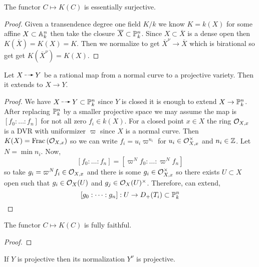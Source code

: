 \documentclass[12pt]{article}
\begin{document}
\begin{prop}
The functor $C \mapsto K(C)$ is essentially surjective. 
\end{prop}

\begin{proof}
Given a transendence degree one field $K / k$ we know $K = k(X)$ for some affine $X \subset \A^n_k$ then take the closure $\overline{X} \subset \P^n_k$. Since $X \subset \overline{X}$ is a dense open then $K(\overline{X}) = K(X) = K$. Then we normalize to get $\overline{X}^\nu \to \overline{X}$ which is birational so get get $K(\overline{X}^\nu) = K(X)$. 
\end{proof}

\begin{lemma}
Let $X \rat Y$ be a rational map from a normal curve to a projective variety. Then it extends to $X \to Y$. 
\end{lemma}

\begin{proof}
We have $X \rat Y \subset \P^n_k$ since $Y$ is closed it is enough to extend $X \to \P^n_k$. After replacing $\P^n_k$ by a smaller projective space we may assume the map is $[f_0 : \dots : f_n]$ for not all zero $f_i \in k(X)$. For a closed point $x \in X$ the ring $\stalk{X}{x}$ is a DVR with uniformizer $\varpi$ since $X$ is a normal curve. Then $K(X) = \Frac{\stalk{X}{x}}$ so we can write $f_i = u_i \varpi^{n_i}$ for $u_i \in \stalk{X}{x}^\times$ and $n_i \in \Z$. Let $N = \min{n_i}$. Now,
\[ [f_0 : \dots : f_n] = [ \varpi^{N} f_0 : \dots : \varpi^{N} f_n] \]
so take $g_i = \varpi^N f_i \in \stalk{X}{x}$ and there is some $g_i \in \stalk{X}{x}^\times$ so there exists $U \subset X$ open such that $g_i \in \struct{X}(U)$ and $g_j \in \struct{X}(U)^\times$. Therefore, can extend,
\[ [g_0 : \dots : g_n] : U \to D_+(T_i) \subset \P^n_k \]

\end{proof}

\begin{prop}
The functor $C \mapsto K(C)$ is fully faithful.
\end{prop}

\begin{proof}

\end{proof}

\begin{prop}
If $Y$ is projective then its normalization $Y^\nu$ is projective. 
\end{prop}
\end{document}
